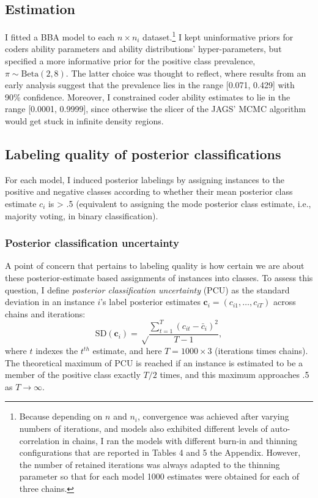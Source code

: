 \documentclass[12pt,]{article}
\begin{document}
\hypertarget{estimation-1}{%
\subsection{Estimation}\label{estimation-1}}

I fitted a BBA model to each \(n\times n_i\) dataset.\footnote{Because
  depending on \(n\) and \(n_i\), convergence was achieved after varying
  numbers of iterations, and models also exhibited different levels of
  auto-correlation in chains, I ran the models with different burn-in
  and thinning configurations that are reported in Tables 4 and 5 the
  Appendix. However, the number of retained iterations was always
  adapted to the thinning parameter so that for each model 1000
  estimates were obtained for each of three chains.} I kept
uninformative priors for coders ability parameters and ability
distributions' hyper-parameters, but specified a more informative prior
for the positive class prevalence, \(\pi \sim \text{Beta}(2, 8)\). The
latter choice was thought to reflect, where results from an early
analysis suggest that the prevalence lies in the range {[}0.071,
0.429{]} with 90\% confidence. Moreover, I constrained coder ability
estimates to lie in the range {[}0.0001, 0.9999{]}, since otherwise the
slicer of the JAGS' MCMC algorithm would get stuck in infinite density
regions.

\hypertarget{labeling-quality-of-posterior-classifications}{%
\subsection{Labeling quality of posterior
classifications}\label{labeling-quality-of-posterior-classifications}}

For each model, I induced posterior labelings by assigning instances to
the positive and negative classes according to whether their mean
posterior class estimate \(c_i\) is \textgreater{} .5 (equivalent to
assigning the mode posterior class estimate, i.e., majority voting, in
binary classification).

\hypertarget{posterior-classification-uncertainty}{%
\subsubsection{Posterior classification
uncertainty}\label{posterior-classification-uncertainty}}

A point of concern that pertains to labeling quality is how certain we
are about these posterior-estimate based assignments of instances into
classes. To assess this question, I define \emph{posterior
classification uncertainty} (PCU) as the standard deviation in an
instance \(i\)'s label posterior estimates
\(\mathbf c_i = (c_{i1}, \ldots, c_{iT})\) across chains and iterations:
\[
  \text{SD}(\mathbf c_i) = \sqrt\frac{\sum_{t=1}^T (c_{it} - \bar{c}_i)^2}{T-1},
\] where \(t\) indexes the \(t^{th}\) estimate, and here
\(T = 1000 \times 3\) (iterations times chains). The theoretical maximum
of PCU is reached if an instance is estimated to be a member of the
positive class exactly \(T/2\) times, and this maximum approaches .5 as
\(T \to \infty\).
\end{document}

